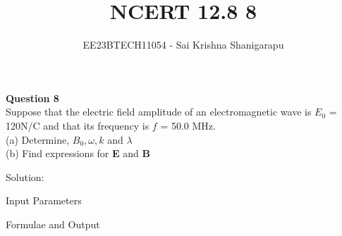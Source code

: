 \documentclass[journal,12pt,twocolumn]{IEEEtran}
\theoremstyle{remark}
\begin{document}

\vspace{3cm}

\title{NCERT 12.8 8}
\author{EE23BTECH11054 - Sai Krishna Shanigarapu%
}
\maketitle
\newpage
\bigskip

\begin{flushleft}
\textbf{Question 8}\\
Suppose that the electric field amplitude of an electromagnetic wave is $E_0$ = 120N/C and that its frequency is $f$ = 50.0 MHz.\\
(a) Determine, $B_0, \omega, k$ and $\lambda$\\
(b) Find expressions for \textbf{E} and \textbf{B}\\
\end{flushleft}

\bigskip

\begin{flushleft}
Solution:
\end{flushleft}

\begin{center}
    \begin{table}[ht]
        \caption{Input Parameters}
        
        \label{tab:table1.12.8.8}
    \end{table}
\end{center}


\begin{flushleft}
    \begin{table}[ht]
       \caption{Formulae and Output}
       
       \label{tab:table2.12.8.8}
    \end{table}
\bigskip
\end{flushleft}

\bigskip
%
%
%
%
\end{document}

